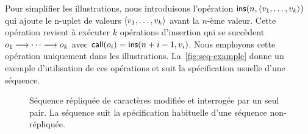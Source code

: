 Pour simplifier les illustrations, nous introduisons l'opération $\trm{ins}(n, \tuple*{v_1,\dotsc,v_k})$ qui ajoute le n-uplet de valeurs $\tuple*{v_1,\dotsc,v_k}$ avant la $n$-ème valeur.
Cette opération revient à exécuter $k$ opérations d'insertion qui se succèdent $o_1 \pre \dotsb \pre o_k$ avec $\trm{call}(o_i) = \trm{ins}(n+i-1, v_i)$.
Nous employons cette opération uniquement dans les illustrations.
La~\autoref{fig:seq-example} donne un exemple d'utilisation de ces opérations et suit la spécification usuelle d'une séquence.

\begin{figure}[htb]
    \newcommand*\hsep{2.4}
    \centering
    \caption[Séquence répliquée de caractères modifiée et interrogée par un seul pair]{Séquence répliquée de caractères modifiée et interrogée par un seul pair.
    La séquence suit la spécification habituelle d'une séquence non-répliquée.}\label{fig:seq-example}
\end{figure}

